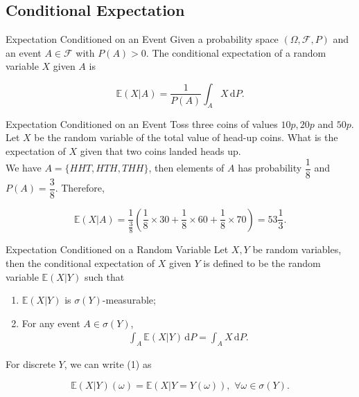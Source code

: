 \subsection{Conditional Expectation}

\begin{frame}{Expectation Conditioned on an Event}
    Given a probability space $(\Omega,\mathcal{F},P)$ and an event $A\in\mathcal{F}$ with $P(A)>0$. The conditional expectation of a random variable $X$ given $A$ is

    $$\mathbb{E}(X|A)=\dfrac{1}{P(A)}\int_A X\,\mathrm{d}P.$$
\end{frame}

\begin{frame}{Expectation Conditioned on an Event}
    Toss three coins of values $10p, 20p$ and $50p$. Let $X$ be the random variable of the total value of head-up coins. What is the expectation of $X$ given that two coins landed heads up.\\

    We have $A=\{HHT, HTH, THH\}$, then elements of $A$ has probability $\dfrac{1}{8}$ and $P(A)=\dfrac{3}{8}$. Therefore,

    $$\mathbb{E}(X|A) = \dfrac{1}{\frac{3}{8}}\left(\dfrac{1}{8}\times 30 + \dfrac{1}{8}\times 60 + \dfrac{1}{8}\times 70\right)=53\dfrac{1}{3}.$$
\end{frame}

\begin{frame}{Expectation Conditioned on a Random Variable}
    Let $X,Y$ be random variables, then the conditional expectation of $X$ given $Y$ is defined to be the random variable $\mathbb{E}(X|Y)$ such that
    \begin{enumerate}
        \item $\mathbb{E}(X|Y)$ is $\sigma(Y)$-measurable;
        \item For any event $A\in\sigma(Y)$,
        \begin{align}
            \int_A \mathbb{E}(X|Y)\,\mathrm{d}P = \int_A X\,\mathrm{d}P.
        \end{align}
    \end{enumerate}
    For discrete $Y$, we can write (1) as

    $$\mathbb{E}(X|Y)(\omega) = \mathbb{E}(X|Y=Y(\omega)),\,\,\forall \omega\in\sigma(Y).$$
\end{frame}

